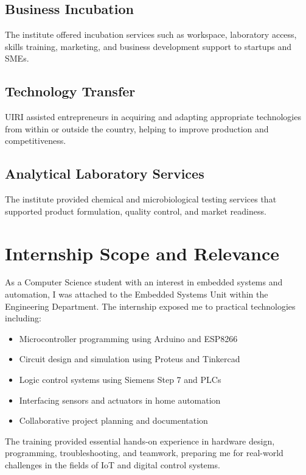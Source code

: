 \documentclass[12pt,a4paper]{report}
\begin{document}
\subsection{Business Incubation}
\noindent The institute offered incubation services such as workspace, laboratory access, skills training, marketing, and business development support to startups and SMEs.

\subsection{Technology Transfer}
\noindent UIRI assisted entrepreneurs in acquiring and adapting appropriate technologies from within or outside the country, helping to improve production and competitiveness.

\subsection{Analytical Laboratory Services}
\noindent The institute provided chemical and microbiological testing services that supported product formulation, quality control, and market readiness.

\section{Internship Scope and Relevance}
\noindent As a Computer Science student with an interest in embedded systems and automation, I was attached to the Embedded Systems Unit within the Engineering Department. The internship exposed me to practical technologies including:
\begin{itemize}
    \item Microcontroller programming using Arduino and ESP8266
    \item Circuit design and simulation using Proteus and Tinkercad
    \item Logic control systems using Siemens Step 7 and PLCs
    \item Interfacing sensors and actuators in home automation
    \item Collaborative project planning and documentation
\end{itemize}

\noindent The training provided essential hands-on experience in hardware design, programming, troubleshooting, and teamwork, preparing me for real-world challenges in the fields of IoT and digital control systems.
\end{document}
